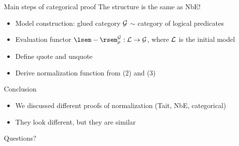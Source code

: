 \documentclass{beamer}
\begin{document}
\begin{frame}{Main steps of categorical proof}
The structure is the same as NbE!
\begin{itemize}
    \item Model construction: glued category $\mathcal{G}$ $\sim$ category of logical predicates
    \item Evaluation functor $\cint[\glueint]{-}[\gluecat] : \syncat \to \gluecat$, where $\mathcal{L}$ is the initial model
    \item Define quote and unquote
    \item Derive normalization function from (2) and (3)
\end{itemize}
\end{frame}

\begin{frame}{Conclusion}
\begin{itemize}
    \item We discussed different proofs of normalization (Tait, NbE, categorical)
    \item They look different, but they are similar
\end{itemize}
\end{frame}

\begin{frame}
\centering
\Large Questions?
\end{frame}
\end{document}
